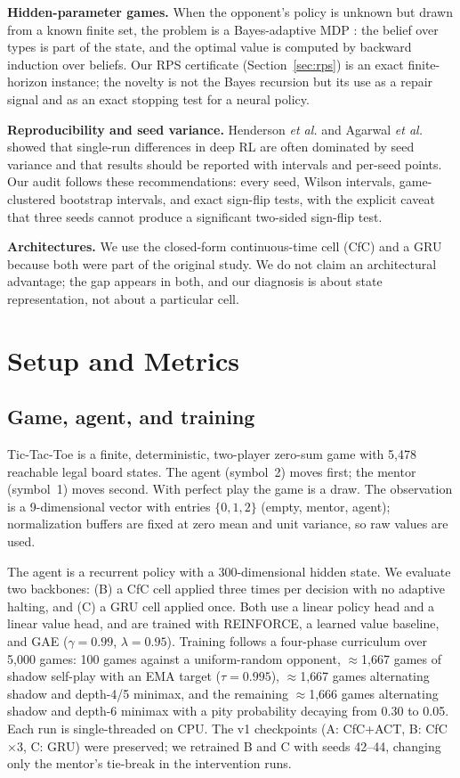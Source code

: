 \documentclass[conference]{IEEEtran}
\newcommand{\etal}{\textit{et al.}}
\begin{document}
\textbf{Hidden-parameter games.} When the opponent's policy is unknown but drawn from a known finite set, the problem is a Bayes-adaptive MDP \cite{duff2002}: the belief over types is part of the state, and the optimal value is computed by backward induction over beliefs. Our RPS certificate (Section~\ref{sec:rps}) is an exact finite-horizon instance; the novelty is not the Bayes recursion but its use as a repair signal and as an exact stopping test for a neural policy.

\textbf{Reproducibility and seed variance.} Henderson \etal \cite{henderson2018} and Agarwal \etal \cite{agarwal2021} showed that single-run differences in deep RL are often dominated by seed variance and that results should be reported with intervals and per-seed points. Our audit follows these recommendations: every seed, Wilson intervals, game-clustered bootstrap intervals, and exact sign-flip tests, with the explicit caveat that three seeds cannot produce a significant two-sided sign-flip test.

\textbf{Architectures.} We use the closed-form continuous-time cell (CfC) \cite{hasani2021} and a GRU \cite{cho2014} because both were part of the original study. We do not claim an architectural advantage; the gap appears in both, and our diagnosis is about state representation, not about a particular cell.

\section{Setup and Metrics}
\label{sec:setup}

\subsection{Game, agent, and training}
Tic-Tac-Toe is a finite, deterministic, two-player zero-sum game with 5{,}478 reachable legal board states. The agent (symbol~2) moves first; the mentor (symbol~1) moves second. With perfect play the game is a draw. The observation is a 9-dimensional vector with entries $\{0,1,2\}$ (empty, mentor, agent); normalization buffers are fixed at zero mean and unit variance, so raw values are used.

The agent is a recurrent policy with a 300-dimensional hidden state. We evaluate two backbones: (B) a CfC cell applied three times per decision with no adaptive halting, and (C) a GRU cell applied once. Both use a linear policy head and a linear value head, and are trained with REINFORCE, a learned value baseline, and GAE ($\gamma=0.99$, $\lambda=0.95$). Training follows a four-phase curriculum over 5{,}000 games: 100 games against a uniform-random opponent, $\approx$1{,}667 games of shadow self-play with an EMA target ($\tau=0.995$), $\approx$1{,}667 games alternating shadow and depth-4/5 minimax, and the remaining $\approx$1{,}666 games alternating shadow and depth-6 minimax with a pity probability decaying from 0.30 to 0.05. Each run is single-threaded on CPU. The v1 checkpoints (A: CfC+ACT, B: CfC$\times$3, C: GRU) were preserved; we retrained B and C with seeds 42--44, changing only the mentor's tie-break in the intervention runs.
\end{document}
